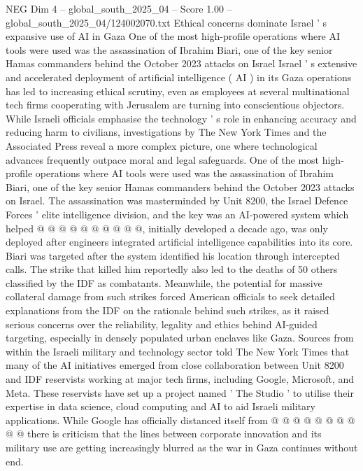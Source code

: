 \begin{textsample}{NEG Dim 4 – global\_south\_2025\_04 – Score 1.00 – global\_south\_2025\_04/124002070.txt}  \label{ex:f4_neg_239}
Ethical concerns dominate Israel ' s expansive use of AI in Gaza One of the most high-profile operations where AI tools were used was the assassination of Ibrahim Biari, one of the key senior Hamas commanders behind the October 2023 attacks on Israel Israel ' s extensive and accelerated deployment of artificial intelligence ( AI ) in its Gaza operations has led to increasing ethical scrutiny, even as employees at several multinational tech firms cooperating with Jerusalem are turning into conscientious objectors.
While Israeli officials emphasise the technology ' s role in enhancing accuracy and reducing harm to civilians, investigations by The New York Times and the Associated Press reveal a more complex picture, one where technological advances frequently outpace moral and legal safeguards.
One of the most high-profile operations where AI tools were used was the assassination of Ibrahim Biari, one of the key senior Hamas commanders behind the October 2023 attacks on Israel.
The assassination was masterminded by Unit 8200, the Israel Defence Forces ' elite intelligence division, and the key was an AI-powered system which helped @ @ @ @ @ @ @ @ @ @, initially developed a decade ago, was only deployed after engineers integrated artificial intelligence capabilities into its core.
Biari was targeted after the system identified his location through intercepted calls.
The strike that killed him reportedly also led to the deaths of 50 others classified by the IDF as combatants.
Meanwhile, the potential for massive collateral damage from such strikes forced American officials to seek detailed explanations from the IDF on the rationale behind such strikes, as it raised serious concerns over the reliability, legality and ethics behind AI-guided targeting, especially in densely populated urban enclaves like Gaza.
Sources from within the Israeli military and technology sector told The New York Times that many of the AI initiatives emerged from close collaboration between Unit 8200 and IDF reservists working at major tech firms, including Google, Microsoft, and Meta.
These reservists have set up a project named ' The Studio ' to utilise their expertise in data science, cloud computing and AI to aid Israeli military applications.
While Google has officially distanced itself from @ @ @ @ @ @ @ @ @ @ there is criticism that the lines between corporate innovation and its military use are getting increasingly blurred as the war in Gaza continues without end.

\end{textsample}
